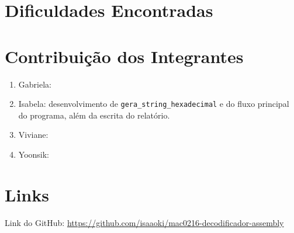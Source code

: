 \documentclass[12pt,a4paper]{article}
\begin{document}
\section{Dificuldades Encontradas}

\section{Contribuição dos Integrantes}
\begin{enumerate}
    \item Gabriela:
    \item Isabela: desenvolvimento de \texttt{gera\_string\_hexadecimal} e do fluxo principal do programa, além da escrita do relatório.
    \item Viviane:
    \item Yoonsik:
\end{enumerate}

\section{Links}
Link do GitHub: \url{https://github.com/isaaoki/mac0216-decodificador-assembly}
\end{document}
